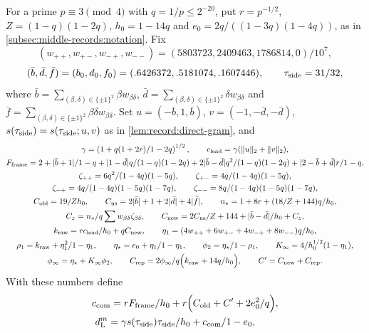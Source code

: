 \begin{definition}\label{def:side-function}
For a prime $p\equiv3\pmod4$ with $q=1/p\le2^{-20}$, put
$r=p^{-1/2}$, $Z=(1-q)(1-2q)$,
$h_0=1-14q$ and $e_0=2q/((1-3q)(1-4q))$, as in
\cref{subsec:middle-records:notation}. Fix
\[
 (w_{++},w_{+-},w_{-+},w_{--})=(5803723,2409463,1786814,0)/10^7,
\]
\[
 (\bar b,\bar d,\bar f)=(b_0,d_0,f_0)=(.6426372,.5181074,.1607446),\qquad
 \tside=31/32,
\]
where $\bar b=\sum_{(\beta,\delta)\in\{\pm1\}^2}\beta
w_{\beta\delta}$,
$\bar d=\sum_{(\beta,\delta)\in\{\pm1\}^2}\delta
w_{\beta\delta}$ and
$\bar f=\sum_{(\beta,\delta)\in\{\pm1\}^2}\beta\delta
w_{\beta\delta}$.
Set $u=(-\bar b,1,\bar b)$, $v=(-1,-\bar d,-\bar d)$,
$s(\tside)=s(\tside;u,v)$ as in \cref{lem:record:direct-gram}, and
\begin{gather*}
 \gamma=\left(1+\frac{q(1+2r)}{1-2q}\right)^{1/2},\qquad
 c_{\rm lead}=\gamma(\|u\|_2+\|v\|_2),\\
 F_{\rm frame}=\frac{2+|\bar b+1|}{1-q}
 +\frac{|1-\bar d|q}{(1-q)(1-2q)}
 +\frac{2|\bar b-\bar d|q^2}{(1-q)(1-2q)}
 +\frac{|2-\bar b+\bar d|r}{1-q},\\
 \zeta_{++}=\frac{6q^2}{(1-4q)(1-5q)},\qquad
 \zeta_{+-}=\frac{4q}{(1-4q)(1-5q)},\\
 \zeta_{-+}=\frac{4q}{(1-4q)(1-5q)(1-7q)},\qquad
 \zeta_{--}=\frac{8q}{(1-4q)(1-5q)(1-7q)},\\
 C_{\rm old}=\frac{19}{Zh_0},\qquad
 C_{\rm ns}=2|\bar b|+1+2|\bar d|+4|\bar f|,\qquad
 n_*=\frac{1+8r+(18/Z+144)q}{h_0},\\
 C_z=\frac{n_*}q\sum w_{\beta\delta}\zeta_{\beta\delta},\qquad
 C_{\rm new}=\frac{2C_{\rm ns}/Z+144+|\bar b-\bar d|}{h_0}+C_z,\\
 k_{\rm raw}=\frac{rc_{\rm lead}}{h_0}+qC_{\rm new},\qquad
 \eta_1=\frac{(4w_{++}+6w_{+-}+4w_{-+}+8w_{--})q}{h_0},\\
 \rho_1=\frac{k_{\rm raw}+\eta_1^2}{1-\eta_1},\qquad
 \eta_\star=\frac{e_0+\eta_1}{1-\eta_1},\qquad
 \phi_2=\frac{\eta_\star}{1-\rho_1},\qquad
 K_\infty=\frac4{h_0^{1/2}(1-\eta_1)},\\
 \phi_\infty=\eta_\star+K_\infty\phi_2,\qquad
 C_{\rm rep}=\frac{2\phi_\infty}q\Bigl(k_{\rm raw}+\frac{14q}{h_0}\Bigr),
 \qquad C'=C_{\rm new}+C_{\rm rep}.
\end{gather*}
With these numbers define
\begin{gather*}
 c_{\rm com}=\frac{rF_{\rm frame}}{h_0}
 +r\Bigl(C_{\rm old}+C'+\frac{2e_0^2}q\Bigr),\\
 d^m_{\rm L}=\frac{\gamma s(\tside)\tside/h_0+c_{\rm com}}{1-e_0},\qquad

\end{gather*}
\end{definition}
